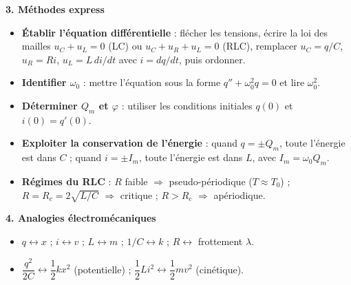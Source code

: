 \documentclass[11pt]{article}
\begin{document}
\begin{bilan}
\textbf{3. Méthodes express}
\begin{itemize}
  \item \textbf{Établir l'équation différentielle} : flécher les tensions, écrire la loi des mailles $u_C + u_L = 0$ (LC) ou $u_C + u_R + u_L = 0$ (RLC), remplacer $u_C = q/C$, $u_R = Ri$, $u_L = L\,di/dt$ avec $i = dq/dt$, puis ordonner.
  \item \textbf{Identifier $\omega_0$} : mettre l'équation sous la forme $q'' + \omega_0^2 q = 0$ et lire $\omega_0^2$.
  \item \textbf{Déterminer $Q_m$ et $\varphi$} : utiliser les conditions initiales $q(0)$ et $i(0) = q'(0)$.
  \item \textbf{Exploiter la conservation de l'énergie} : quand $q = \pm Q_m$, toute l'énergie est dans $C$ ; quand $i = \pm I_m$, toute l'énergie est dans $L$, avec $I_m = \omega_0 Q_m$.
  \item \textbf{Régimes du RLC} : $R$ faible $\Rightarrow$ pseudo-périodique ($T \approx T_0$) ; $R = R_c = 2\sqrt{L/C}$ $\Rightarrow$ critique ; $R > R_c$ $\Rightarrow$ apériodique.
\end{itemize}

\textbf{4. Analogies électromécaniques}
\begin{itemize}
  \item $q \leftrightarrow x$ ; \quad $i \leftrightarrow v$ ; \quad $L \leftrightarrow m$ ; \quad $1/C \leftrightarrow k$ ; \quad $R \leftrightarrow$ frottement $\lambda$.
  \item $\dfrac{q^2}{2C} \leftrightarrow \dfrac{1}{2}kx^2$ (potentielle) ; \quad $\dfrac{1}{2}Li^2 \leftrightarrow \dfrac{1}{2}mv^2$ (cinétique).
\end{itemize}
\end{bilan}
\end{document}
